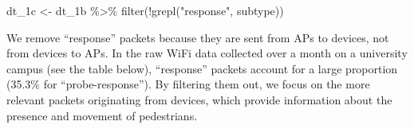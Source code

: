 \documentclass[
  letterpaper,
]{scrbook}
\newenvironment{Shaded}{\begin{snugshade}}{\end{snugshade}}
\newcommand{\FunctionTok}[1]{\textcolor[rgb]{0.28,0.35,0.67}{#1}}
\newcommand{\NormalTok}[1]{\textcolor[rgb]{0.00,0.23,0.31}{#1}}
\newcommand{\OtherTok}[1]{\textcolor[rgb]{0.00,0.23,0.31}{#1}}
\newcommand{\SpecialCharTok}[1]{\textcolor[rgb]{0.37,0.37,0.37}{#1}}
\newcommand{\StringTok}[1]{\textcolor[rgb]{0.13,0.47,0.30}{#1}}
\begin{document}
\begin{Shaded}
\begin{Highlighting}[]
\NormalTok{dt\_1c }\OtherTok{\textless{}{-}}\NormalTok{ dt\_1b }\SpecialCharTok{\%\textgreater{}\%}
  \FunctionTok{filter}\NormalTok{(}\SpecialCharTok{!}\FunctionTok{grepl}\NormalTok{(}\StringTok{"response"}\NormalTok{, subtype))}
\end{Highlighting}
\end{Shaded}

\begin{tcolorbox}[enhanced jigsaw, bottomrule=.15mm, opacitybacktitle=0.6, toprule=.15mm, colback=white, colbacktitle=quarto-callout-note-color!10!white, left=2mm, colframe=quarto-callout-note-color-frame, coltitle=black, title=\textcolor{quarto-callout-note-color}{\faInfo}\hspace{0.5em}{Why We Should Remove ``Response'' Packets}, opacityback=0, breakable, bottomtitle=1mm, toptitle=1mm, titlerule=0mm, arc=.35mm, leftrule=.75mm, rightrule=.15mm]

We remove ``response'' packets because they are sent from APs to
devices, not from devices to APs. In the raw WiFi data collected over a
month on a university campus (see the table below), ``response'' packets
account for a large proportion (35.3\% for ``probe-response''). By
filtering them out, we focus on the more relevant packets originating
from devices, which provide information about the presence and movement
of pedestrians.


\end{tcolorbox}
\end{document}
